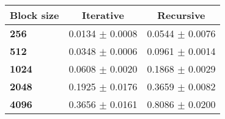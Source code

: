 \begin{tabular}{lcc}\toprule
\textbf{Block size}  & \textbf{Iterative} & \textbf{Recursive}\\\midrule
\textbf{256}  & 0.0134 $\pm$ 0.0008 & 0.0544 $\pm$ 0.0076\\
\textbf{512}  & 0.0348 $\pm$ 0.0006 & 0.0961 $\pm$ 0.0014\\
\textbf{1024}  & 0.0608 $\pm$ 0.0020 & 0.1868 $\pm$ 0.0029\\
\textbf{2048}  & 0.1925 $\pm$ 0.0176 & 0.3659 $\pm$ 0.0082\\
\textbf{4096} & 0.3656 $\pm$ 0.0161 & 0.8086 $\pm$ 0.0200\\
\bottomrule
\end{tabular}
